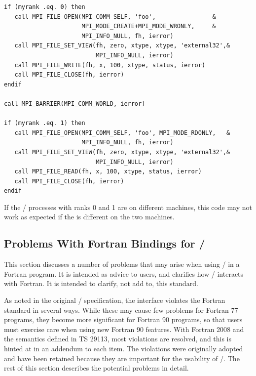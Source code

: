 \begin{users}
\begin{example}
\begin{lstlisting}[language={[MPI08]Fortran}]
if (myrank .eq. 0) then
   call MPI_FILE_OPEN(MPI_COMM_SELF, 'foo',                &
                      MPI_MODE_CREATE+MPI_MODE_WRONLY,     &
                      MPI_INFO_NULL, fh, ierror)
   call MPI_FILE_SET_VIEW(fh, zero, xtype, xtype, 'external32',&
                          MPI_INFO_NULL, ierror)
   call MPI_FILE_WRITE(fh, x, 100, xtype, status, ierror)
   call MPI_FILE_CLOSE(fh, ierror)
endif

call MPI_BARRIER(MPI_COMM_WORLD, ierror)

if (myrank .eq. 1) then
   call MPI_FILE_OPEN(MPI_COMM_SELF, 'foo', MPI_MODE_RDONLY,   &
                      MPI_INFO_NULL, fh, ierror)
   call MPI_FILE_SET_VIEW(fh, zero, xtype, xtype, 'external32',&
                          MPI_INFO_NULL, ierror)
   call MPI_FILE_READ(fh, x, 100, xtype, status, ierror)
   call MPI_FILE_CLOSE(fh, ierror)
endif
\end{lstlisting}
\end{example}
If the \MPI/ processes with ranks 0 and 1 are on different machines, this code may not work
as expected if the  is different on the two machines.
\end{users}


\subsection{Problems With Fortran Bindings for \texorpdfstring{\MPI/}{MPI}}
\label{sec:misc-problems}
This section discusses a number of problems that may arise
when using \MPI/ in a Fortran program. It is intended as
advice to users, and clarifies how \MPI/ interacts with
Fortran. It is intended to clarify, not add to, this standard.

As noted in the original \MPI/ specification, the interface violates
the Fortran standard in several ways. While these may cause few problems
for Fortran 77 programs, they become more significant for Fortran 90
programs, so that users must exercise care when using new Fortran 90
features.
With Fortran 2008 and the semantics defined in
TS 29113, most violations
are resolved, and this is hinted at in an addendum to each item.
The violations were originally adopted and have been
retained because they are important for the usability of \MPI/.  The
rest of this section describes the potential problems in detail.

